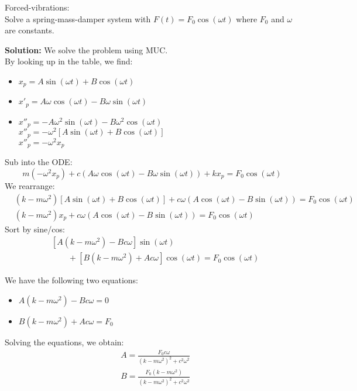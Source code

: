 \begin{exmp}{Forced-vibrations:}\\
Solve a spring-mass-damper system with $F(t)=F_0\cos(\omega t)$ where $F_0$ and $\omega$ are constants.

\textbf{Solution:}
We solve the problem using MUC.\\
By looking up in the table, we find:
\begin{itemize}
\item $x_p = A\sin(\omega t)+B\cos(\omega t)$
\item $x'_p = A\omega\cos(\omega t)-B\omega\sin(\omega t)$
\item $x''_p = -A\omega^2\sin(\omega t)-B\omega^2\cos(\omega t)$\\
$x''_p=-\omega^2\left[A\sin(\omega t)+B\cos(\omega t)\right]$\\
$x''_p=-\omega^2x_p$\\
\end{itemize}
Sub into the ODE:
\begin{equation*}
m\left(-\omega^2x_p\right)+c\left(A\omega\cos(\omega t)-B\omega\sin(\omega t)\right) +kx_p = F_0\cos(\omega t)
\end{equation*}
We rearrange:
\begin{align*}
&\left(k-m\omega^2\right)\left[A\sin(\omega t)+B\cos(\omega t)\right]+c\omega\left(A\cos(\omega t)-B\sin(\omega t)\right) = F_0\cos(\omega t)\\
&\left(k-m\omega^2\right)x_p+c\omega\left(A\cos(\omega t)-B\sin(\omega t)\right)  = F_0\cos(\omega t)
\end{align*}
Sort by sine/cos:
\begin{align*}
&\left[A\left(k-m\omega^2\right)-B c\omega\right]\sin(\omega t) \\
&\qquad +\left[B\left(k-m\omega^2\right)+Ac\omega\right]\cos(\omega t)  = F_0\cos(\omega t)
\end{align*}

We have the following two equations:
\begin{itemize}
\item $A\left(k-m\omega^2\right)-B c\omega =0$
\item $B\left(k-m\omega^2\right)+Ac\omega=F_0$
\end{itemize}
Solving the equations, we obtain:
\begin{align*}
&A=\frac{F_0 c\omega}{(k-m\omega^2)^2+c^2\omega^2}\\
&B=\frac{F_0 (k-m\omega^2)}{(k-m\omega^2)^2+c^2\omega^2}
\end{align*}


\end{exmp}
